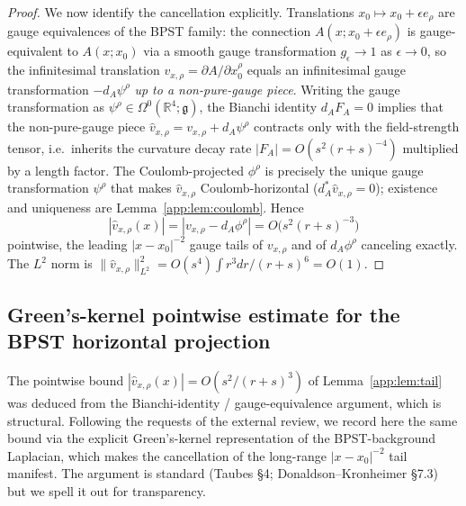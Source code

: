 \documentclass[11pt,letterpaper]{article}
\theoremstyle{definition}
\newcommand{\fg}{\mathfrak{g}}
\begin{document}
\begin{proof}
We now identify the cancellation explicitly. Translations $x_0 \mapsto x_0 + \epsilon e_\rho$ are gauge equivalences of the BPST family: the connection $A(x; x_0 + \epsilon e_\rho)$ is gauge-equivalent to $A(x; x_0)$ via a smooth gauge transformation $g_\epsilon \to 1$ as $\epsilon \to 0$, so the infinitesimal translation $v_{x,\rho} = \partial A/\partial x_0^\rho$ equals an infinitesimal gauge transformation $-d_A \psi^\rho$ \emph{up to a non-pure-gauge piece}. Writing the gauge transformation as $\psi^\rho \in \Omega^0(\mathbb{R}^4; \fg)$, the Bianchi identity $d_A F_A = 0$ implies that the non-pure-gauge piece $\hat v_{x,\rho} = v_{x,\rho} + d_A\psi^\rho$ contracts only with the field-strength tensor, i.e.\ inherits the curvature decay rate $|F_A| = O(s^2(r+s)^{-4})$ multiplied by a length factor. The Coulomb-projected $\phi^\rho$ is precisely the unique gauge transformation $\psi^\rho$ that makes $\hat v_{x,\rho}$ Coulomb-horizontal ($d_A^*\hat v_{x,\rho} = 0$); existence and uniqueness are Lemma~\ref{app:lem:coulomb}. Hence
\[
|\hat v_{x,\rho}(x)| = |v_{x,\rho} - d_A\phi^\rho| = O\bigl(s^2(r+s)^{-3}\bigr)
\]
pointwise, the leading $|x-x_0|^{-2}$ gauge tails of $v_{x,\rho}$ and of $d_A\phi^\rho$ canceling exactly. The $L^2$ norm is $\|\hat v_{x,\rho}\|_{L^2}^2 = O(s^4)\int r^3 dr/(r+s)^6 = O(1)$.
\end{proof}

\subsection{Green's-kernel pointwise estimate for the BPST horizontal projection}\label{app:sec:green}

The pointwise bound $|\hat v_{x,\rho}(x)| = O(s^2/(r+s)^3)$ of Lemma~\ref{app:lem:tail} was deduced from the Bianchi-identity / gauge-equivalence argument, which is structural. Following the requests of the external review, we record here the same bound via the explicit Green's-kernel representation of the BPST-background Laplacian, which makes the cancellation of the long-range $|x-x_0|^{-2}$ tail manifest. The argument is standard (Taubes \cite{Taubes1988} \S 4; Donaldson--Kronheimer \cite{DK1990} \S 7.3) but we spell it out for transparency.
\end{document}
